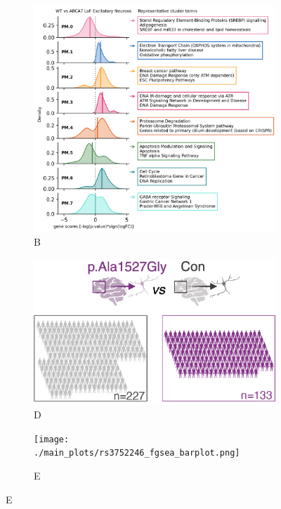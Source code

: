 \documentclass[12pt]{article}
\begin{document}
\begin{figure}[H]
    \begin{subfigure}[t]{0.45\textwidth}
        \caption{B}
        \includegraphics[width=\textwidth]{./main_plots/kl_densities.png}        
    \end{subfigure}
    \begin{subfigure}[t]{0.3\textwidth}
        \caption{D}
        \includegraphics[width=\textwidth]{./main_plots/common_var_cohort_cartoon.png}        
    \end{subfigure}
    \hspace{0.01\textwidth} \begin{subfigure}[t]{0.225\textwidth}
        \caption{E}
        \texttt{[image: ./main\_plots/rs3752246\_fgsea\_barplot.png]}        

\end{subfigure}
\end{figure}
\end{document}
